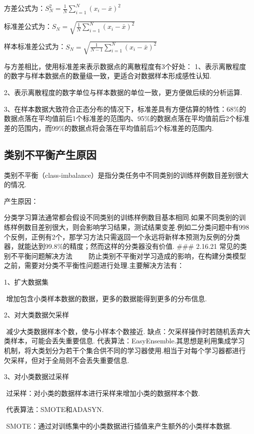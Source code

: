 方差公式为：$S^2_{N}=\frac{1}{N}\sum_{i=1}^{N}(x_{i}-\bar{x})^{2}​$

标准差公式为：$S_{N}=\sqrt{\frac{1}{N}\sum_{i=1}^{N}(x_{i}-\bar{x})^{2}}​$

样本标准差公式为：$S_{N}=\sqrt{\frac{1}{N-1}\sum_{i=1}^{N}(x_{i}-\bar{x})^{2}}​$

与方差相比，使用标准差来表示数据点的离散程度有3个好处：
1、表示离散程度的数字与样本数据点的数量级一致，更适合对数据样本形成感性认知.

2、表示离散程度的数字单位与样本数据的单位一致，更方便做后续的分析运算.

3、在样本数据大致符合正态分布的情况下，标准差具有方便估算的特性：68\%的数据点落在平均值前后1个标准差的范围内、95\%的数据点落在平均值前后2个标准差的范围内，而99\%的数据点将会落在平均值前后3个标准差的范围内.

\subsection{类别不平衡产生原因}\label{ux7c7bux522bux4e0dux5e73ux8861ux4ea7ux751fux539fux56e0}

​
类别不平衡（class-imbalance）是指分类任务中不同类别的训练样例数目差别很大的情况.

产生原因：

​
分类学习算法通常都会假设不同类别的训练样例数目基本相同.如果不同类别的训练样例数目差别很大，则会影响学习结果，测试结果变差.例如二分类问题中有998个反例，正例有2个，那学习方法只需返回一个永远将新样本预测为反例的分类器，就能达到99.8\%的精度；然而这样的分类器没有价值.
\#\#\# 2.16.21 常见的类别不平衡问题解决方法
  防止类别不平衡对学习造成的影响，在构建分类模型之前，需要对分类不平衡性问题进行处理.主要解决方法有：

1、扩大数据集

​ 增加包含小类样本数据的数据，更多的数据能得到更多的分布信息.

2、对大类数据欠采样

​ 减少大类数据样本个数，使与小样本个数接近. ​
缺点：欠采样操作时若随机丢弃大类样本，可能会丢失重要信息. ​
代表算法：EasyEnsemble.其思想是利用集成学习机制，将大类划分为若干个集合供不同的学习器使用.相当于对每个学习器都进行欠采样，但对于全局则不会丢失重要信息.

3、对小类数据过采样

​ 过采样：对小类的数据样本进行采样来增加小类的数据样本个数.

​ 代表算法：SMOTE和ADASYN.

​ SMOTE：通过对训练集中的小类数据进行插值来产生额外的小类样本数据.

